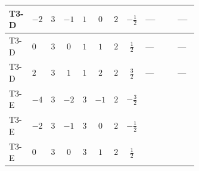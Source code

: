 \documentclass[8pt]{article}
\begin{document}
\begin{landscape}
\begin{longtable}{@{}llcccccc >{\raggedright\arraybackslash}p{0.21\linewidth} >{\raggedright\arraybackslash}p{0.21\linewidth} >{\raggedright\arraybackslash}p{0.21\linewidth}@{}}
\midrule
T3-D & $-2$ & $3$ & $-1$ & $1$ & $0$ & $2$ & $-\frac{1}{2}$ & --- & \scriptsize\adjustbox{max width=\linewidth}{$\begin{gathered} +10 {\lambda_{S_2}^{(1)}}^2\end{gathered}$} & --- \\
\midrule
T3-D & $0$ & $3$ & $0$ & $1$ & $1$ & $2$ & $\frac{1}{2}$ & --- & \scriptsize\adjustbox{max width=\linewidth}{$\begin{gathered} +10 {\lambda_{S_2}^{(1)}}^2\end{gathered}$} & --- \\
\midrule
T3-D & $2$ & $3$ & $1$ & $1$ & $2$ & $2$ & $\frac{3}{2}$ & --- & \scriptsize\adjustbox{max width=\linewidth}{$\begin{gathered} +10 {\lambda_{S_2}^{(1)}}^2\end{gathered}$} & --- \\
\midrule
T3-E & $-4$ & $3$ & $-2$ & $3$ & $-1$ & $2$ & $-\frac{3}{2}$ & \scriptsize\adjustbox{max width=\linewidth}{$\begin{gathered} +\frac{3 {\lambda_{HS_2}^{(A)}}^2}{2}\end{gathered}$} & \scriptsize\adjustbox{max width=\linewidth}{$\begin{gathered} +14 {\lambda_{S_2}^{(1)}}^2\end{gathered}$} & \scriptsize\adjustbox{max width=\linewidth}{$\begin{gathered} +26 {\lambda_{S_2}^{(A)}}^2\end{gathered}$} \\
\midrule
T3-E & $-2$ & $3$ & $-1$ & $3$ & $0$ & $2$ & $-\frac{1}{2}$ & \scriptsize\adjustbox{max width=\linewidth}{$\begin{gathered} +\frac{3 {\lambda_{HS_2}^{(A)}}^2}{2}\end{gathered}$} & \scriptsize\adjustbox{max width=\linewidth}{$\begin{gathered} +14 {\lambda_{S_2}^{(1)}}^2\end{gathered}$} & \scriptsize\adjustbox{max width=\linewidth}{$\begin{gathered} +26 {\lambda_{S_2}^{(A)}}^2\end{gathered}$} \\
\midrule
T3-E & $0$ & $3$ & $0$ & $3$ & $1$ & $2$ & $\frac{1}{2}$ & \scriptsize\adjustbox{max width=\linewidth}{$\begin{gathered} +\frac{3 {\lambda_{HS_2}^{(A)}}^2}{2}\end{gathered}$} & \scriptsize\adjustbox{max width=\linewidth}{$\begin{gathered} +14 {\lambda_{S_2}^{(1)}}^2\end{gathered}$} & \scriptsize\adjustbox{max width=\linewidth}{$\begin{gathered} +26 {\lambda_{S_2}^{(A)}}^2\end{gathered}$} \\

\end{longtable}
\end{landscape}
\end{document}
